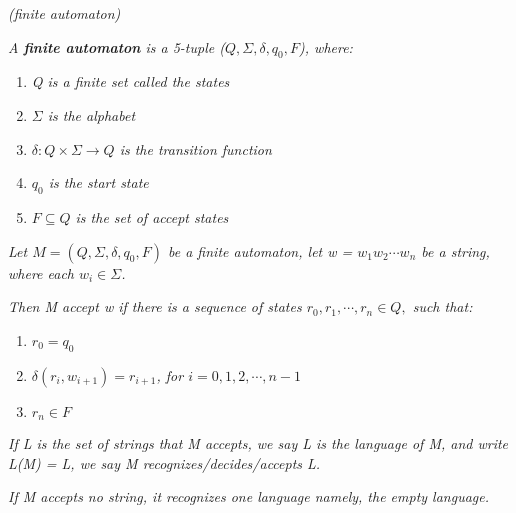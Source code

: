 \documentclass{article}
\begin{document}
\begin{defn}
    \textit{(finite automaton)}

    \textit{A \textbf{finite automaton} is a 5-tuple ($Q,\Sigma,\delta,q_0,F$), where:}

    \begin{enumerate}
        \item \textit{Q is a finite set called the states}
        \item \textit{$\Sigma$ is the alphabet}
        \item \textit{$\delta:Q\times \Sigma \rightarrow Q$ is the transition function}
        \item \textit{$q_0$ is the start state }
        \item \textit{$F\subseteq Q$ is the set of accept states}
    \end{enumerate}
\end{defn}

\begin{defn}
    \textit{Let $M = (Q,\Sigma,\delta,q_0,F)$ be a finite automaton, let w = $w_1w_2\cdots w_n$ be a string, where each $w_i \in \Sigma$.}

    \textit{Then M accept w if there is a sequence of states $r_0,r_1,\cdots,r_n\in Q,$ such that:}

    \begin{enumerate}
        \item $r_0=q_0$
        \item \textit{$\delta(r_i,w_{i+1}) = r_{i+1}$, for $i = 0,1,2,\cdots,n-1$}
        \item $r_n \in F$
    \end{enumerate}
\end{defn}

\begin{defn}
    \textit{If L is the set of strings that M accepts, we say L is the language of M, and write L(M) = L, we say M recognizes/decides/accepts L.}

    \textit{If M accepts no string, it recognizes one language namely, the empty language.}
\end{defn}
\end{document}
